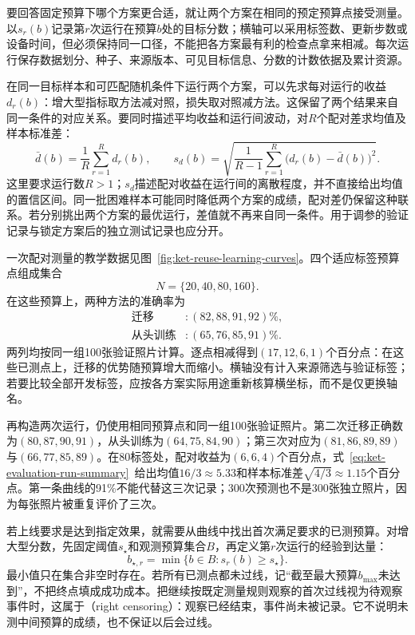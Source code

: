 要回答固定预算下哪个方案更合适，就让两个方案在相同的预定预算点接受测量。以$s_r(b)$记录第$r$次运行在预算$b$处的目标分数；横轴可以采用标签数、更新步数或设备时间，但必须保持同一口径，不能把各方案最有利的检查点拿来相减。每次运行保存数据划分、种子、来源版本、可见目标信息、分数的计数依据及累计资源。

在同一目标样本和可匹配随机条件下运行两个方案，可以先求每对运行的收益$d_r(b)$：增大型指标取方法减对照，损失取对照减方法。这保留了两个结果来自同一条件的对应关系。要同时描述平均收益和运行间波动，对$R$个配对差求均值及样本标准差：
\begin{equation}
  \bar d(b)=\frac1R\sum_{r=1}^{R}d_r(b),\qquad
  s_d(b)=\sqrt{\frac{1}{R-1}
    \sum_{r=1}^{R}\bigl(d_r(b)-\bar d(b)\bigr)^2}.
  \label{eq:ket-evaluation-run-summary}
\end{equation}
这里要求运行数$R>1$；$s_d$描述配对收益在运行间的离散程度，并不直接给出均值的置信区间。同一批困难样本可能同时降低两个方案的成绩，配对差仍保留这种联系。若分别挑出两个方案的最优运行，差值就不再来自同一条件。用于调参的验证记录与锁定方案后的独立测试记录也应分开。

一次配对测量的教学数据见图~\ref{fig:ket-reuse-learning-curves}。四个适应标签预算点组成集合
\[
  N=\{20,40,80,160\}.
\]
在这些预算上，两种方法的准确率为
\[
  \begin{aligned}
    \text{迁移} &: (82,88,91,92)\%,\\
    \text{从头训练} &: (65,76,85,91)\%.
  \end{aligned}
\]
两列均按同一组100张验证照片计算。逐点相减得到$(17,12,6,1)$个百分点：在这些已测点上，迁移的优势随预算增大而缩小。横轴没有计入来源筛选与验证标签；若要比较全部开发标签，应按各方案实际用途重新核算横坐标，而不是仅更换轴名。

再构造两次运行，仍使用相同预算点和同一组100张验证照片。第二次迁移正确数为$(80,87,90,91)$，从头训练为$(64,75,84,90)$；第三次对应为$(81,86,89,89)$与$(66,77,85,89)$。在80标签处，配对收益为$(6,6,4)$个百分点，式~\eqref{eq:ket-evaluation-run-summary}~给出均值$16/3\approx5.33$和样本标准差$\sqrt{4/3}\approx1.15$个百分点。第一条曲线的91\%不能代替这三次记录；300次预测也不是300张独立照片，因为每张照片被重复评价了三次。

若上线要求是达到指定效果，就需要从曲线中找出首次满足要求的已测预算。对增大型分数，先固定阈值$s_\star$和观测预算集合$B$，再定义第$r$次运行的经验到达量：
\begin{equation}
  b_{\star,r}=\min\{b\in B:s_r(b)\geq s_\star\}.
  \label{eq:ket-evaluation-threshold}
\end{equation}
最小值只在集合非空时存在。若所有已测点都未过线，记“截至最大预算$b_{\max}$未达到”，不把终点填成成功成本。把继续按既定测量规则观察的首次过线视为待观察事件时，这属于（right censoring）：观察已经结束，事件尚未被记录。它不说明未测中间预算的成绩，也不保证以后会过线。

